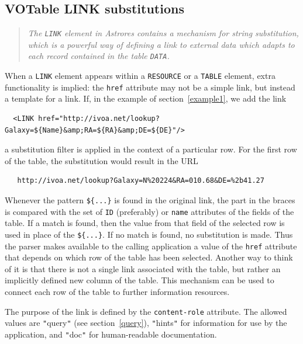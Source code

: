 \documentclass[11pt,a4paper]{ivoa}
\def\Aref#1{section~\ref{#1}}
\let\fg=\color
\def\attr#1{{\tt{\fg{DarkRed}#1}}}
\def\elem#1{{\tt{\fg{DarkRed}#1}}}
\def\literalvalue#1{{\tt"}{{\fg{DarkPurple}#1}}{\tt"}}
\begin{document}
{{{\subsection{VOTable LINK substitutions}
\label{LINK}

\begin{quote}\em \fg{DarkBlue}
  The \elem{LINK} element in Astrores \citep{astrores}
  contains a mechanism for string substitution,
  which is a powerful way of defining a link to external data
  which adapts to each record contained in the table \elem{DATA}.
\end{quote}

When a {\elem{LINK}} element appears within a \elem{RESOURCE} or a
{\elem{TABLE}} element,
extra functionality is implied: the {\attr{href}}
attribute may not be a simple link, but instead
a template for a link. If, in the  example of
\Aref{example1}, we add the link

\begin{verbatim}
  <LINK href="http://ivoa.net/lookup?Galaxy=${Name}&amp;RA=${RA}&amp;DE=${DE}"/>
\end{verbatim}

\noindent a substitution filter is applied in the context of a particular row.
For the first row of the table, the substitution would result in the URL

\begin{verbatim}
   http://ivoa.net/lookup?Galaxy=N%20224&RA=010.68&DE=%2b41.27
\end{verbatim}

Whenever the pattern {\tt{\$\{...\}}}
is found in the original link, the part in the braces is compared
with the set of {\attr{ID}} (preferably) or \attr{name}
attributes of the fields of the table. If a match is found, then the
value from that field of the selected row is used in place of the
{\tt{\$\{...\}}}. If no match is found, no substitution is made. Thus the
parser makes available to the calling application a value of the {\attr{href}}
attribute that depends on which row of the table has been selected.
Another way to think of it is that there is not a single link
associated with the table, but rather an implicitly defined new
column of the table. This mechanism can be used to connect each row
of the table to further information resources.



The purpose of the link is defined by the {\attr{content-role}}
attribute. The allowed values are {\literalvalue{query}}
(see \Aref{query}),
{\literalvalue{hints}} for information for use by the application,
and {\literalvalue{doc}} for  human-readable documentation.

}}}
\end{document}
